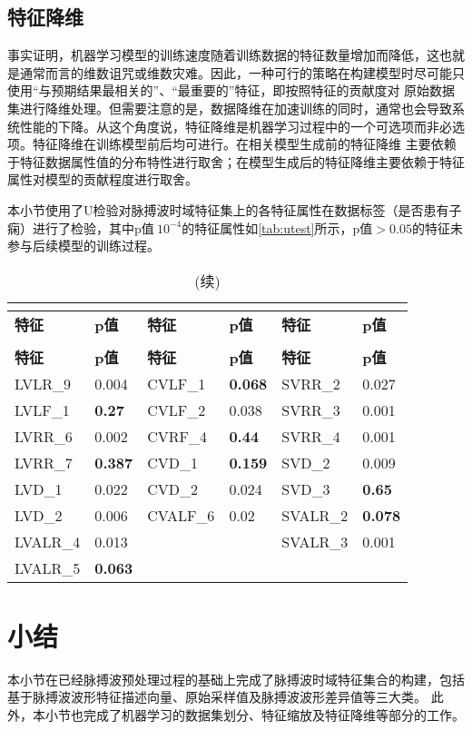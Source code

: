 \subsection{特征降维}
事实证明，机器学习模型的训练速度随着训练数据的特征数量增加而降低，这也就是通常而言的维数诅咒或维数灾难。因此，一种可行的策略在构建模型时尽可能只使用“与预期结果最相关的”、“最重要的”特征，即按照特征的贡献度对
原始数据集进行降维处理。但需要注意的是，数据降维在加速训练的同时，通常也会导致系统性能的下降。从这个角度说，特征降维是机器学习过程中的一个可选项而非必选项。特征降维在训练模型前后均可进行。在相关模型生成前的特征降维
主要依赖于特征数据属性值的分布特性进行取舍；在模型生成后的特征降维主要依赖于特征属性对模型的贡献程度进行取舍。

本小节使用了U检验对脉搏波时域特征集上的各特征属性在数据标签（是否患有子痫）进行了检验，其中p值$\> 10^{-4}$的特征属性如\autoref{tab:utest}所示，p值$> 0.05$的特征未参与后续模型的训练过程。

\begin{center}
  \begin{longtable}{m{2.5cm}<{\centering}m{2cm}<{\centering}m{2.5cm}<{\centering}m{2cm}<{\centering}m{2.5cm}<{\centering}m{2cm}<{\centering}}
    \caption[脉搏波时域特征集数据特征的U检验结果]{脉搏波时域特征集数据特征的U检验结果。p值> 0.05的结果被加粗显示。}\\
    \label{tab:utest}\\
        \toprule
        \textbf{特征}&\textbf{p值}&\textbf{特征}&\textbf{p值}&\textbf{特征}&\textbf{p值}\\
        \midrule
        \endfirsthead
        \caption[]{(续)}\\
        \midrule
        \textbf{特征}&\textbf{p值}&\textbf{特征}&\textbf{p值}&\textbf{特征}&\textbf{p值}\\
        \midrule
        \endhead 
        \midrule
        \endfoot
        \bottomrule
        \endlastfoot
          LVLR\_9  &  0.004 &  CVLF\_1  &  \textbf{0.068} &  SVRR\_2  &  0.027 \\
          LVLF\_1  &  \textbf{0.27}  &  CVLF\_2  &  0.038 &  SVRR\_3  &  0.001 \\
          LVRR\_6  &  0.002 &  CVRF\_4  &  \textbf{0.44}  &  SVRR\_4  &  0.001 \\
          LVRR\_7  &  \textbf{0.387} &  CVD\_1   &  \textbf{0.159} &  SVD\_2   &  0.009 \\
          LVD\_1   &  0.022 &  CVD\_2   &  0.024 &  SVD\_3   &  \textbf{0.65}  \\
          LVD\_2   &  0.006 &  CVALF\_6 &  0.02  &  SVALR\_2 &  \textbf{0.078} \\
          LVALR\_4 &  0.013 &           &        &  SVALR\_3 &  0.001 \\
          LVALR\_5 &  \textbf{0.063} &           &        &           &               
  \end{longtable}
\end{center}

\section{小结}
本小节在已经脉搏波预处理过程的基础上完成了脉搏波时域特征集合的构建，包括基于脉搏波波形特征描述向量、原始采样值及脉搏波波形差异值等三大类。
此外，本小节也完成了机器学习的数据集划分、特征缩放及特征降维等部分的工作。